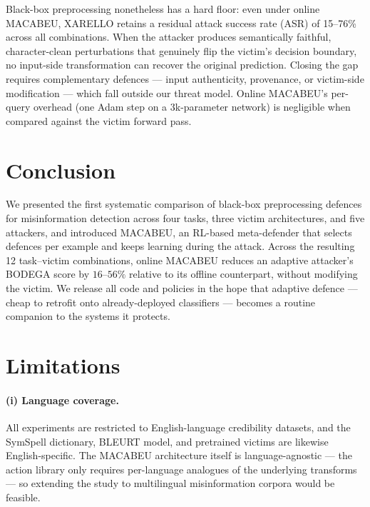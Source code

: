 \documentclass[11pt]{article}
\begin{document}
Black-box preprocessing nonetheless has a hard floor: even under online MACABEU, XARELLO retains a residual attack success rate (ASR) of 15--76\% across all combinations. When the attacker produces semantically faithful, character-clean perturbations that genuinely flip the victim's decision boundary, no input-side transformation can recover the original prediction. Closing the gap requires complementary defences --- input authenticity, provenance, or victim-side modification --- which fall outside our threat model. Online MACABEU's per-query overhead (one Adam step on a 3k-parameter network) is negligible when compared against the victim forward pass.

\section{Conclusion}
We presented the first systematic comparison of black-box preprocessing defences for misinformation detection across four tasks, three victim architectures, and five attackers, and introduced MACABEU, an RL-based meta-defender that selects defences per example and keeps learning during the attack. Across the resulting 12 task--victim combinations, online MACABEU reduces an adaptive attacker's BODEGA score by $16$--$56\%$ relative to its offline counterpart, without modifying the victim. We release all code and policies in the hope that adaptive defence --- cheap to retrofit onto already-deployed classifiers --- becomes a routine companion to the systems it protects.

%

\section*{Limitations}

\paragraph{(i) Language coverage.} All experiments are restricted to English-language credibility datasets, and the SymSpell dictionary, BLEURT model, and pretrained victims are likewise English-specific. The MACABEU architecture itself is language-agnostic --- the action library only requires per-language analogues of the underlying transforms --- so extending the study to multilingual misinformation corpora would be feasible.
\end{document}
